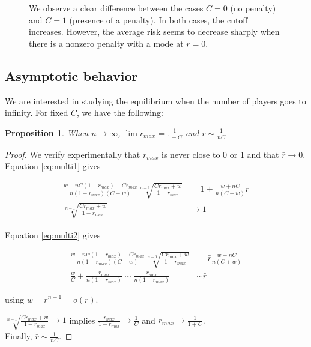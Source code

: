 \documentclass[preprint,12pt,authoryear]{elsarticle}
\newtheorem{proposition}[theorem]{Proposition}
\theoremstyle{definition}
\begin{document}
\begin{figure}[htbp]
  \centering
  \begin{minipage}[t]{0.48\textwidth}
    \centering
    
  \end{minipage}
  \hfill
  \begin{minipage}[t]{0.48\textwidth}
    \centering
    
  \end{minipage}
  \caption{We observe a clear difference between the cases $C=0$ (no penalty) and $C=1$ (presence of a penalty). In both cases, the cutoff increases. However, the average risk seems to decrease sharply when there is a nonzero penalty with a mode at $r=0$.}
  \label{fig:solution-multiple}  
\end{figure}

\subsection{Asymptotic behavior}

We are interested in studying the equilibrium when the number of players goes to infinity. For fixed $C$, we have the following:

\begin{proposition}When $n\rightarrow \infty$,
    $\lim {r_{max}} = \frac{1}{1+C}$ and $\bar r \sim \frac{1}{n C}$
\end{proposition}


\begin{proof}
We verify experimentally that $r_{max}$ is never close to 0 or 1 and that $\bar r \rightarrow 0$.
Equation \ref{eq:multi1} gives

\begin{align*}
    \frac{w + n C (1-{r_{max}}) + C {r_{max}}}{n (1-{r_{max}})(C+w)} \sqrt[n-1]{\frac{C{r_{max}}+w}{1-{r_{max}}}} &= 1 + \frac{w + nC}{n(C+w)} \bar r \\
    \sqrt[n-1]{\frac{C{r_{max}}+w}{1-{r_{max}}}} &\rightarrow 1
\end{align*}

Equation \ref{eq:multi2} gives

\begin{align*}
    \frac{w - nw(1-{r_{max}})+C{r_{max}}}{n(1-{r_{max}})(C+w)} \sqrt[n-1]{\frac{C{r_{max}}+w}{1-{r_{max}}}} &= \bar r \frac{w + nC}{n(C+w)} \\
    \frac{w}{C} + \frac{{r_{max}}}{n(1-{r_{max}})} \sim \frac{{r_{max}}}{n(1-{r_{max}})}  &\sim \bar r
\end{align*}


using $w = \bar r ^{n-1} = o(\bar r)$.

$\sqrt[n-1]{\frac{C{r_{max}}+w}{1-{r_{max}}}} \rightarrow 1$ implies $\frac{{r_{max}}}{1-{r_{max}}} \rightarrow \frac{1}C$ and ${r_{max}} \rightarrow \frac{1}{1+C}$.\\Finally, $\bar r \sim \frac{1}{nC}$.
\end{proof}
\end{document}
